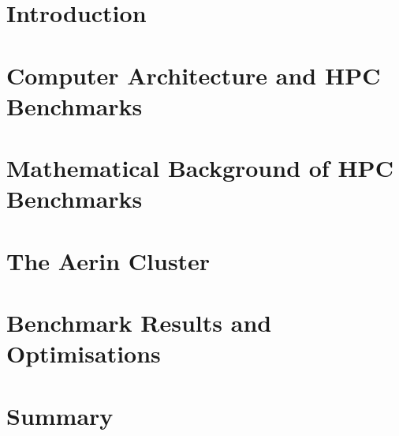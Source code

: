 \documentclass{report}
\begin{document}
%
%
\chapter{Introduction}



%
%
\chapter{Computer Architecture and HPC Benchmarks}



%
%
\chapter{Mathematical Background of HPC Benchmarks}



%
%
\chapter{The Aerin Cluster}



%
%
\chapter{Benchmark Results and Optimisations}



%
%
\chapter{Summary}



%
%
\printbibliography[heading=bibintoc, title={References}]
\end{document}

